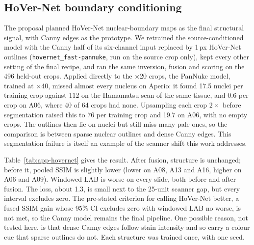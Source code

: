 \subsection{HoVer-Net boundary conditioning}
\label{app:hovernet}
The proposal planned HoVer-Net nuclear-boundary maps as the final structural signal, with Canny edges as the
prototype. We retrained the source-conditioned model with the Canny half of its six-channel input replaced by
1\,px HoVer-Net outlines (\texttt{hovernet\_fast-pannuke}, run on the source crop only), kept every other
setting of the final recipe, and ran the same inversion, fusion and scoring on the 496 held-out crops.
Applied directly to the $\times$20 crops, the PanNuke model, trained at $\times$40, missed almost every
nucleus on Aperio: it found 17.5 nuclei per training crop against 112 on the Hamamatsu scan of the same
tissue, and 0.6 per crop on A06, where 40 of 64 crops had none. Upsampling each crop $2\times$ before
segmentation raised this to 76 per training crop and 19.7 on A06, with no empty crops. The outlines then lie
on nuclei but still miss many pale ones, so the comparison is between sparse nuclear outlines and dense Canny
edges. This segmentation failure is itself an example of the scanner shift this work addresses.

Table~\ref{tab:app-hovernet} gives the result. After fusion, structure is unchanged; before it, pooled SSIM is
slightly lower (lower on A08, A13 and A16, higher on A06 and A09). Windowed LAB is worse on every slide, both before and after fusion.
The loss, about 1.3, is small next to the 25-unit scanner gap, but every interval excludes zero.
The pre-stated criterion for calling HoVer-Net better, a fused SSIM gain whose 95\% CI excludes zero with
windowed LAB no worse, is not met, so the Canny model remains the final pipeline. One possible reason, not
tested here, is that dense Canny edges follow stain intensity and so carry a colour cue that sparse outlines
do not. Each structure was trained once, with one seed.

